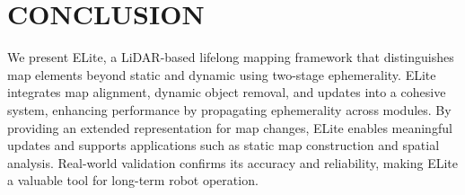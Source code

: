 \section{CONCLUSION}
\label{sec:conclusion}

We present ELite, a LiDAR-based lifelong mapping framework that distinguishes map elements beyond static and dynamic using two-stage ephemerality. 
ELite integrates map alignment, dynamic object removal, and updates into a cohesive system, enhancing performance by propagating ephemerality across modules. 
By providing an extended representation for map changes, ELite enables meaningful updates and supports applications such as static map construction and spatial analysis. 
Real-world validation confirms its accuracy and reliability, making ELite a valuable tool for long-term robot operation.